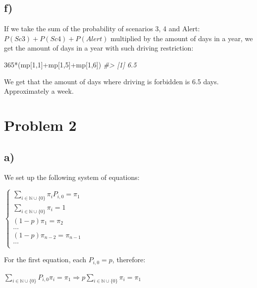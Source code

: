 \documentclass[
]{article}
\newenvironment{Shaded}{\begin{snugshade}}{\end{snugshade}}
\newcommand{\CommentTok}[1]{\textcolor[rgb]{0.56,0.35,0.01}{\textit{#1}}}
\newcommand{\DecValTok}[1]{\textcolor[rgb]{0.00,0.00,0.81}{#1}}
\newcommand{\NormalTok}[1]{#1}
\newcommand{\SpecialCharTok}[1]{\textcolor[rgb]{0.00,0.00,0.00}{#1}}
\begin{document}
\newpage

\hypertarget{f}{%
\subsection{f)}\label{f}}

If we take the sum of the probability of scenarios 3, 4 and Alert:
\(P(Sc3) + P(Sc4) + P(Alert)\) multiplied by the amount of days in a
year, we get the amount of days in a year with such driving restriction:

\begin{Shaded}
\begin{Highlighting}[]
\DecValTok{365}\SpecialCharTok{*}\NormalTok{(mp[}\DecValTok{1}\NormalTok{,}\DecValTok{1}\NormalTok{]}\SpecialCharTok{+}\NormalTok{mp[}\DecValTok{1}\NormalTok{,}\DecValTok{5}\NormalTok{]}\SpecialCharTok{+}\NormalTok{mp[}\DecValTok{1}\NormalTok{,}\DecValTok{6}\NormalTok{])}
\CommentTok{\#\textgreater{} [1] 6.5}
\end{Highlighting}
\end{Shaded}

We get that the amount of days where driving is forbidden is 6.5 days.
Approximately a week.

\newpage

\hypertarget{problem-2}{%
\section{Problem 2}\label{problem-2}}

\hypertarget{a-1}{%
\subsection{a)}\label{a-1}}

We set up the following system of equations:

\(\begin{cases} \sum_{i \in \mathbb{N} \cup \{0\}} \pi_{i} P_{i,0} = \pi_{1} \\ \sum_{i \in \mathbb{N} \cup \{0\}} \pi_{i} = 1 \\ (1 - p) \pi_{1} = \pi_{2} \\ \dots \\ (1 - p) \pi_{n-2} = \pi_{n-1} \\ \dots \\ \end{cases}\)

For the first equation, each \(P_{i,0} = p\), therefore:

\(\sum_{i \in \mathbb{N} \cup \{0\}} P_{i,0} \pi_{i} = \pi_{1} \Rightarrow p \sum_{i \in \mathbb{N} \cup \{0\}} \pi_{i} = \pi_{1}\)
\end{document}
